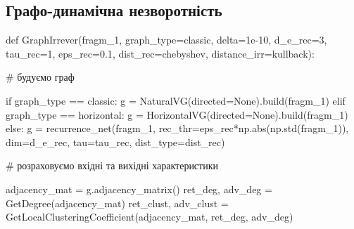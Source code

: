 \documentclass[
  letterpaper,
]{report}
\newenvironment{Shaded}{\begin{snugshade}}{\end{snugshade}}
\newcommand{\BuiltInTok}[1]{\textcolor[rgb]{0.00,0.23,0.31}{#1}}
\newcommand{\CommentTok}[1]{\textcolor[rgb]{0.37,0.37,0.37}{#1}}
\newcommand{\ControlFlowTok}[1]{\textcolor[rgb]{0.00,0.23,0.31}{#1}}
\newcommand{\DecValTok}[1]{\textcolor[rgb]{0.68,0.00,0.00}{#1}}
\newcommand{\FloatTok}[1]{\textcolor[rgb]{0.68,0.00,0.00}{#1}}
\newcommand{\KeywordTok}[1]{\textcolor[rgb]{0.00,0.23,0.31}{#1}}
\newcommand{\NormalTok}[1]{\textcolor[rgb]{0.00,0.23,0.31}{#1}}
\newcommand{\OperatorTok}[1]{\textcolor[rgb]{0.37,0.37,0.37}{#1}}
\newcommand{\StringTok}[1]{\textcolor[rgb]{0.13,0.47,0.30}{#1}}
\newcommand{\VariableTok}[1]{\textcolor[rgb]{0.07,0.07,0.07}{#1}}
\begin{document}
\hypertarget{ux433ux440ux430ux444ux43e-ux434ux438ux43dux430ux43cux456ux447ux43dux430-ux43dux435ux437ux432ux43eux440ux43eux442ux43dux456ux441ux442ux44c}{%
\subsection{Графо-динамічна
незворотність}\label{ux433ux440ux430ux444ux43e-ux434ux438ux43dux430ux43cux456ux447ux43dux430-ux43dux435ux437ux432ux43eux440ux43eux442ux43dux456ux441ux442ux44c}}

\begin{Shaded}
\begin{Highlighting}[]
\KeywordTok{def}\NormalTok{ GraphIrrever(fragm\_1, graph\_type}\OperatorTok{=}\StringTok{\textquotesingle{}classic\textquotesingle{}}\NormalTok{, delta}\OperatorTok{=}\FloatTok{1e{-}10}\NormalTok{, d\_e\_rec}\OperatorTok{=}\DecValTok{3}\NormalTok{, tau\_rec}\OperatorTok{=}\DecValTok{1}\NormalTok{, eps\_rec}\OperatorTok{=}\FloatTok{0.1}\NormalTok{, dist\_rec}\OperatorTok{=}\StringTok{\textquotesingle{}chebyshev\textquotesingle{}}\NormalTok{, distance\_irr}\OperatorTok{=}\StringTok{\textquotesingle{}kullback\textquotesingle{}}\NormalTok{):}
    
    \CommentTok{\# будуємо граф }
    
    \ControlFlowTok{if}\NormalTok{ graph\_type }\OperatorTok{==} \StringTok{\textquotesingle{}classic\textquotesingle{}}\NormalTok{:}
\NormalTok{        g }\OperatorTok{=}\NormalTok{ NaturalVG(directed}\OperatorTok{=}\VariableTok{None}\NormalTok{).build(fragm\_1)}
    \ControlFlowTok{elif}\NormalTok{ graph\_type }\OperatorTok{==} \StringTok{\textquotesingle{}horizontal\textquotesingle{}}\NormalTok{:}
\NormalTok{        g }\OperatorTok{=}\NormalTok{ HorizontalVG(directed}\OperatorTok{=}\VariableTok{None}\NormalTok{).build(fragm\_1)}
    \ControlFlowTok{else}\NormalTok{:}
\NormalTok{        g }\OperatorTok{=}\NormalTok{ recurrence\_net(fragm\_1, rec\_thr}\OperatorTok{=}\NormalTok{eps\_rec}\OperatorTok{*}\NormalTok{np.}\BuiltInTok{abs}\NormalTok{(np.std(fragm\_1)), dim}\OperatorTok{=}\NormalTok{d\_e\_rec, tau}\OperatorTok{=}\NormalTok{tau\_rec, dist\_type}\OperatorTok{=}\NormalTok{dist\_rec)}
    
    \CommentTok{\# розраховуємо вхідні та вихідні характеристики }
    
\NormalTok{    adjacency\_mat }\OperatorTok{=}\NormalTok{ g.adjacency\_matrix()}
\NormalTok{    ret\_deg, adv\_deg }\OperatorTok{=}\NormalTok{ GetDegree(adjacency\_mat)}
\NormalTok{    ret\_clust, adv\_clust }\OperatorTok{=}\NormalTok{ GetLocalClusteringCoefficient(adjacency\_mat, ret\_deg, adv\_deg)}
    

\end{Highlighting}
\end{Shaded}
\end{document}
